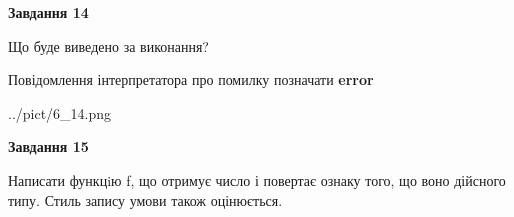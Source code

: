 \documentclass[11pt, ukrainian]{article}
\begin{document}
{\begin {large}
{\begin {center}\textbf{Завдання 14}\end {center}}\par
Що буде виведено за виконання? \par
Повідомлення інтерпретатора про помилку позначати \textbf{error}

\begin{center}
	{../pict/6_14.png}
\end{center}
\newpage

{\begin {center}\textbf{Завдання 15}\end {center}}\par

Написати функцiю f, що отримує число і повертає ознаку того, що воно дійсного типу. Стиль запису умови також оцінюється.\par
\newpage

\end {large}}
\end{document}
